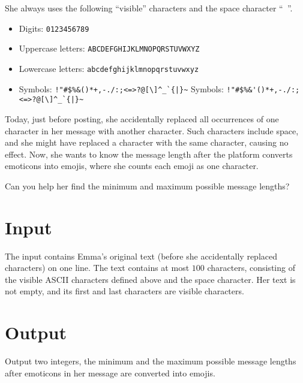 She always uses the following ``visible'' characters and the space character ``\texttt{ }''.

\begin{itemize}
  \item Digits: \texttt{0123456789}
  \item Uppercase letters: \texttt{ABCDEFGHIJKLMNOPQRSTUVWXYZ}
  \item Lowercase letters: \texttt{abcdefghijklmnopqrstuvwxyz}
  \item %
  \ifpdf%
  Symbols: \texttt{!"\#\$\%\&\textquotesingle{}()*+,-./:;<=>?@[\textbackslash{}]\textasciicircum{}\_\`{}\{|\}\textasciitilde{}}
  \else%
  Symbols: \texttt{!"\#\$\%\&}\verb|'|\texttt{()*+,-./:;<=>?@[\textbackslash{}]\textasciicircum{}\_\`{}\{|\}\textasciitilde{}}
  \fi%
\end{itemize}

Today, just before posting, she accidentally replaced all occurrences of one character
in her message with another character.
%
Such characters include space, and she might have replaced a character with
the same character, causing no effect.
%
Now, she wants to know the message length after the platform converts emoticons
into emojis, where she counts each emoji as one character.

Can you help her find the minimum and maximum possible message lengths?


\section*{Input}

The input contains Emma's original text (before she accidentally replaced characters)
on one line.
The text contains at most $100$ characters,
consisting of the visible ASCII characters defined above and the space character.
%
Her text is not empty, and its first and last characters are visible characters.

\section*{Output}

Output two integers,
the minimum and the maximum possible message lengths
after emoticons in her message are converted into emojis.
